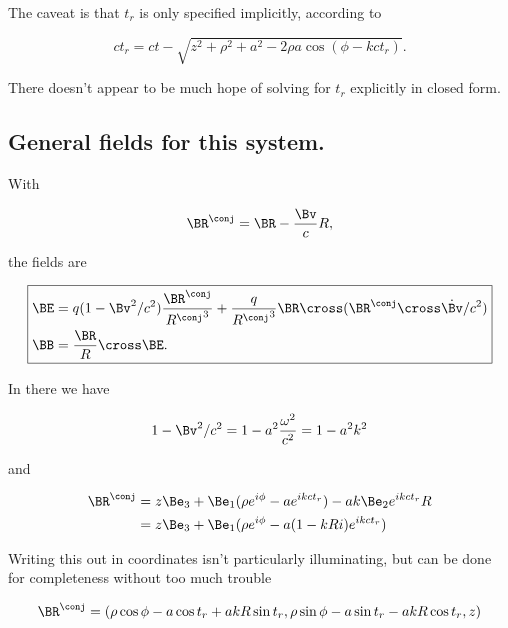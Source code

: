 The caveat is that $t_r$ is only specified implicitly, according to

\begin{equation}\label{eqn:relativisticElectrodynamicsExamReflection:520}
\boxed{
c t_r = c t - \sqrt{z^2 + \rho^2 + a^2 - 2 \rho a \cos( \phi - k c t_r ) }.
}
\end{equation}

There doesn't appear to be much hope of solving for $t_r$ explicitly in closed form.

\subsection{General fields for this system.}

With 

\begin{equation}\label{eqn:relativisticElectrodynamicsExamReflection:540}
\BR^\conj = \BR - \frac{\Bv}{c} R,
\end{equation}

the fields are

\begin{equation}\label{eqn:relativisticElectrodynamicsExamReflection:560}
\boxed{
\begin{aligned}
\BE &= q (1 - \Bv^2/c^2) \frac{\BR^\conj}{{R^\conj}^3} + \frac{q}{{R^\conj}^3} \BR \cross (\BR^\conj \cross \dot{\Bv}/c^2) \\
\BB &= \frac{\BR}{R} \cross \BE.
\end{aligned}
}
\end{equation}

In there we have

\begin{equation}\label{eqn:relativisticElectrodynamicsExamReflection:580}
1 - \Bv^2/c^2 = 1 - a^2 \frac{\omega^2}{c^2} = 1 - a^2 k^2
\end{equation}

and

\begin{align*}
\BR^\conj 
&= 
z \Be_3 + \Be_1 (\rho e^{i \phi} - a e^{i k c t_r} )
-
a k \Be_2 e^{i k c t_r} R \\
&= 
z \Be_3 + \Be_1 (\rho e^{i \phi} - a (1 - k R i) e^{i k c t_r} )
\end{align*}

Writing this out in coordinates isn't particularly illuminating, but can be done for completeness without too much trouble

\begin{equation}\label{eqn:relativisticElectrodynamicsExamReflection:600}
\BR^\conj = 
( \rho \cos\phi - a \cos t_r + a k R \sin t_r,
  \rho \sin\phi - a \sin t_r - a k R \cos t_r,
  z )
\end{equation}

